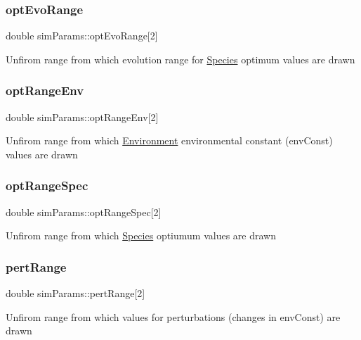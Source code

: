 \subsubsection{\texorpdfstring{opt\+Evo\+Range}{optEvoRange}}
{\footnotesize\ttfamily double sim\+Params\+::opt\+Evo\+Range\mbox{[}2\mbox{]}}

Unfirom range from which evolution range for \hyperlink{classSpecies}{Species} optimum values are drawn \hypertarget{structsimParams_ab59d469330753aebd7ce7ab893a6eda4}{}\label{structsimParams_ab59d469330753aebd7ce7ab893a6eda4} 
\subsubsection{\texorpdfstring{opt\+Range\+Env}{optRangeEnv}}
{\footnotesize\ttfamily double sim\+Params\+::opt\+Range\+Env\mbox{[}2\mbox{]}}

Unfirom range from which \hyperlink{classEnvironment}{Environment} environmental constant (env\+Const) values are drawn \hypertarget{structsimParams_a169d5e6c66da8b477bb7e384fe4c90b8}{}\label{structsimParams_a169d5e6c66da8b477bb7e384fe4c90b8} 
\subsubsection{\texorpdfstring{opt\+Range\+Spec}{optRangeSpec}}
{\footnotesize\ttfamily double sim\+Params\+::opt\+Range\+Spec\mbox{[}2\mbox{]}}

Unfirom range from which \hyperlink{classSpecies}{Species} optiumum values are drawn \hypertarget{structsimParams_a9b9d328e41381a83004b5fa062248fc7}{}\label{structsimParams_a9b9d328e41381a83004b5fa062248fc7} 
\subsubsection{\texorpdfstring{pert\+Range}{pertRange}}
{\footnotesize\ttfamily double sim\+Params\+::pert\+Range\mbox{[}2\mbox{]}}

Unfirom range from which values for perturbations (changes in env\+Const) are drawn \hypertarget{structsimParams_aa07ddc0d55d057a586dc98ffd113e064}{}\label{structsimParams_aa07ddc0d55d057a586dc98ffd113e064} 

